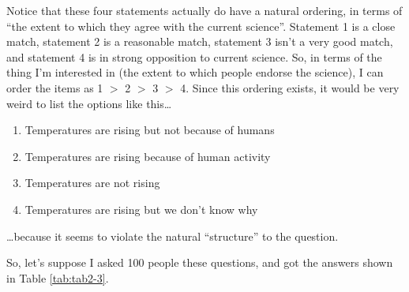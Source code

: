 \documentclass[
]{book}
\providecommand{\tightlist}{%
  \setlength{\itemsep}{0pt}\setlength{\parskip}{0pt}}
\begin{document}
Notice that these four statements actually do have a natural ordering, in terms of ``the extent to which they agree with the current science''. Statement 1 is a close match, statement 2 is a reasonable match, statement 3 isn't a very good match, and statement 4 is in strong opposition to current science. So, in terms of the thing I'm interested in (the extent to which people endorse the science), I can order the items as 1 \(>\) 2 \(>\) 3 \(>\) 4. Since this ordering exists, it would be very weird to list the options like this\ldots{}

\begin{enumerate}
\def\labelenumi{\arabic{enumi}.}
\tightlist
\item
  Temperatures are rising but not because of humans
\item
  Temperatures are rising because of human activity
\item
  Temperatures are not rising
\item
  Temperatures are rising but we don't know why
\end{enumerate}

\ldots because it seems to violate the natural ``structure'' to the question.

So, let's suppose I asked 100 people these questions, and got the answers shown in Table \ref{tab:tab2-3}.

 
  \providecommand{\huxb}[2]{\arrayrulecolor[RGB]{#1}\global\arrayrulewidth=#2pt}
  \providecommand{\huxvb}[2]{\color[RGB]{#1}\vrule width #2pt}
  \providecommand{\huxtpad}[1]{\rule{0pt}{#1}}
  \providecommand{\huxbpad}[1]{\rule[-#1]{0pt}{#1}}
\end{document}
